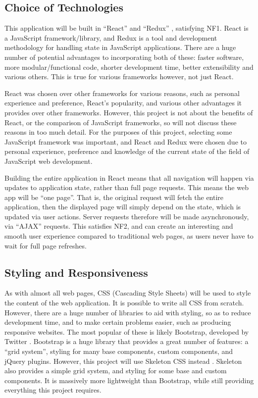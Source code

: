 \documentclass[11pt,openright,a4paper]{report}
\begin{document}
\subsection{Choice of Technologies}
This application will be built in \enquote{React} \parencite{react} and \enquote{Redux} \parencite{redux}, satisfying NF1. React is a JavaScript framework/library, and Redux is a tool and development methodology for handling state in JavaScript applications. There are a huge number of potential advantages to incorporating both of these: faster software, more modular/functional code, shorter development time, better extensibility and various others. This is true for various frameworks however, not just React. 

React was chosen over other frameworks for various reasons, such as personal experience and preference, React's popularity, and various other advantages it provides over other frameworks. However, this project is not about the benefits of React, or the comparison of JavaScript frameworks, so will not discuss these reasons in too much detail. For the purposes of this project, selecting some JavaScript framework was important, and React and Redux were chosen due to personal experience, preference and knowledge of the current state of the field of JavaScript web development.

Building the entire application in React means that all navigation will happen via updates to application state, rather than full page requests. This means the web app will be \enquote{one page}. That is, the original request will fetch the entire application, then the displayed page will simply depend on the state, which is updated via user actions. Server requests therefore will be made asynchronously, via \enquote{AJAX} requests. This satisfies NF2, and can create an interesting and smooth user experience compared to traditional web pages, as users never have to wait for full page refreshes.

\subsection{Styling and Responsiveness}
As with almost all web pages, CSS (Cascading Style Sheets) will be used to style the content of the web application. It is possible to write all CSS from scratch. However, there are a huge number of libraries to aid with styling, so as to reduce development time, and to make certain problems easier, such as producing responsive websites. The most popular of these is likely Bootstrap, developed by Twitter \parencite{bootstrapcss}. Bootstrap is a huge library that provides a great number of features: a \enquote{grid system}, styling for many base components, custom components, and jQuery plugins. However, this project will use Skeleton CSS instead \parencite{skeletoncss}. Skeleton also provides a simple grid system, and styling for some base and custom components. It is massively more lightweight than Bootstrap, while still providing everything this project requires.
\end{document}
